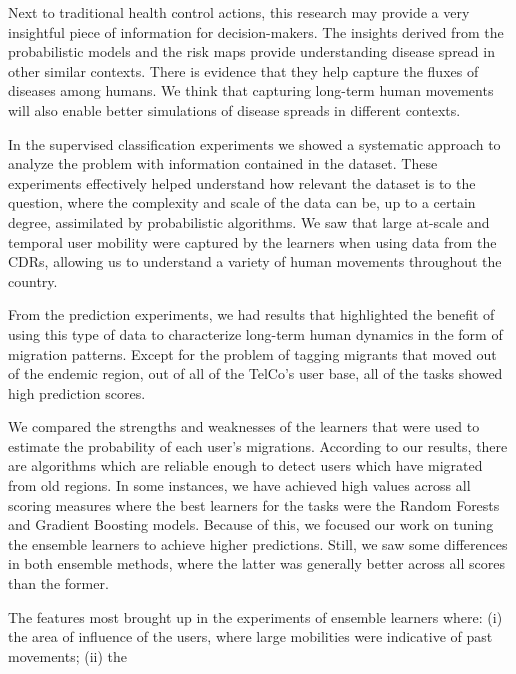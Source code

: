Next to traditional health control actions, this research may provide a very insightful piece of information for decision-makers.
The insights derived from the probabilistic models and the risk maps provide understanding disease spread in other similar contexts.
There is evidence that they help capture the fluxes of diseases among humans.
We think that capturing long-term human movements will also enable better simulations of disease spreads in different contexts.


In the supervised classification experiments we showed a systematic approach to analyze the problem with information contained in the dataset.
These experiments effectively helped understand how relevant the dataset is to the question, where the complexity and scale of the data can be, up to a certain degree, assimilated by probabilistic algorithms.
We saw that large at-scale and temporal user mobility were captured by the learners when using data from the CDRs, allowing us to understand a variety of human movements throughout the country.


From the prediction experiments, we had results that highlighted the benefit of using this type of data to characterize long-term human dynamics in the form of migration patterns.
Except for the problem of tagging migrants that moved out of the endemic region, out of all of the TelCo's user base, all of the tasks showed high prediction scores.

We compared the strengths and weaknesses of the learners that  were used to estimate the probability of each user's migrations.
According to our results, there are algorithms which are reliable enough to detect users which have migrated from old regions.
In some instances, we have achieved high values across all scoring measures where the best learners for the tasks were the Random Forests and Gradient Boosting models.
Because of this, we focused our work on tuning the ensemble learners to achieve higher predictions.
Still, we saw some differences in both ensemble methods, where the latter was generally better across all scores than the former.


The features most brought up in the experiments of ensemble learners where: (i) the area of influence of the users, where large mobilities were indicative of past movements; (ii) the


